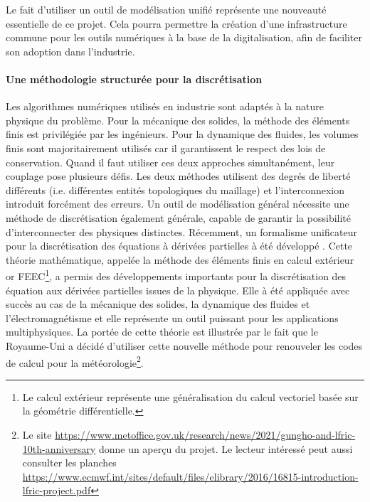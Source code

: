 \documentclass[12pt, french]{article}
\begin{document}
	\vspace{.5cm}
	
	Le fait d'utiliser un outil de modélisation unifié représente une nouveauté essentielle de ce projet. Cela pourra permettre la création d'une infrastructure commune pour les outils numériques à la base de la digitalisation, afin de faciliter son adoption dans l'industrie.
	
	

	\paragraph{\large Une méthodologie structurée pour la discrétisation \\}
	Les algorithmes numériques utilisés en industrie sont adaptés à la nature physique du problème. Pour la mécanique des solides, la méthode des éléments finis est privilégiée par les ingénieurs. Pour la dynamique des fluides, les volumes finis sont majoritairement utilisés car il garantissent le respect des lois de conservation. Quand il faut utiliser ces deux approches simultanément, leur couplage pose plusieurs défis. Les deux méthodes utilisent des degrés de liberté différents (i.e. différentes entités topologiques du maillage) et l'interconnexion introduit forcément des erreurs. Un outil de modélisation général nécessite une méthode de discrétisation également générale, capable de  garantir la possibilité d'interconnecter des physiques distinctes. Récemment, un formalisme unificateur pour la discrétisation des équations à dérivées partielles  à été développé  \cite{arnold2006acta}. Cette théorie mathématique, appelée la méthode des éléments finis en calcul extérieur or FEEC\footnote{Le calcul extérieur représente une généralisation du calcul vectoriel basée sur la géométrie différentielle.}, a permis des développements importants pour la discrétisation des équation aux dérivées partielles issues de la physique. Elle à été appliquée avec succès au cas de la mécanique des solides, la dynamique des fluides et l'électromagnétisme et elle représente un outil puissant pour les applications multiphysiques. La portée de cette théorie est illustrée par le fait que le Royaume-Uni a décidé d'utiliser cette nouvelle méthode pour renouveler les codes de calcul pour la météorologie\footnote{Le site \url{https://www.metoffice.gov.uk/research/news/2021/gungho-and-lfric-10th-anniversary} donne un aperçu du projet. Le lecteur intéressé peut aussi consulter les planches  \url{https://www.ecmwf.int/sites/default/files/elibrary/2016/16815-introduction-lfric-project.pdf}}.
	
\end{document}
